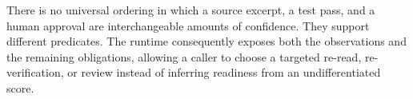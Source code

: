 There is no universal ordering in which a source excerpt, a test pass, and a human approval are interchangeable amounts of confidence. They support different predicates. The runtime consequently exposes both the observations and the remaining obligations, allowing a caller to choose a targeted re-read, re-verification, or review instead of inferring readiness from an undifferentiated score.
